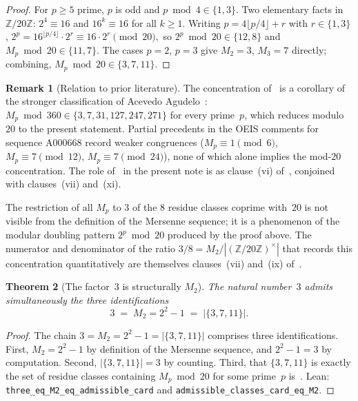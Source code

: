 \documentclass[11pt]{amsart}
\newtheorem{Theorem}{Theorem}[section]
\theoremstyle{definition}
\newtheorem{Remark}[Theorem]{Remark}
\newcommand{\Mp}{M_{p}}
\newcommand{\Ztwenty}{(\mathbb{Z}/20\mathbb{Z})^{\times}}
\newcommand{\lean}[1]{\texttt{#1}}
\begin{document}
\begin{proof}
For $p\geq 5$ prime, $p$ is odd and $p\bmod 4\in\{1,3\}$.  Two
elementary facts in $\mathbb{Z}/20\mathbb{Z}$: $2^{4}\equiv 16$ and
$16^{k}\equiv 16$ for all $k\geq 1$.  Writing $p=4\lfloor p/4\rfloor+r$
with $r\in\{1,3\}$,
$
  2^{p} = 16^{\lfloor p/4\rfloor}\cdot 2^{r} \equiv 16\cdot 2^{r}
  \pmod{20},
$
so $2^{p}\bmod 20\in\{12,8\}$ and $\Mp\bmod 20\in\{11,7\}$.  The cases
$p=2$, $p=3$ give $M_{2}=3$, $M_{3}=7$ directly; combining,
$\Mp\bmod 20\in\{3,7,11\}$.
\end{proof}

\begin{Remark}[Relation to prior
literature]\label{rem:acevedo}
The concentration of~ is a corollary of
the stronger classification of Acevedo
Agudelo~\cite{acevedo-2020}:
$\Mp\bmod 360\in\{3,7,31,127,247,271\}$ for every prime~$p$, which
reduces modulo~$20$ to the present statement. Partial precedents in
the OEIS comments for sequence A000668 record weaker congruences
($\Mp\equiv 1\pmod{6}$, $\Mp\equiv 7\pmod{12}$,
$\Mp\equiv 7\pmod{24}$), none of which alone implies the mod-$20$
concentration. The role of~ in the
present note is as clause~(vi)
of~, conjoined with clauses~(vii) and~(xi).
\end{Remark}

The restriction of all $\Mp$ to $3$ of the $8$ residue classes coprime
with~$20$ is not visible from the definition of the Mersenne sequence;
it is a phenomenon of the modular doubling pattern $2^{p}\bmod 20$
produced by the proof above.  The numerator and denominator of the
ratio $3/8=M_{2}/|\Ztwenty|$ that records this concentration
quantitatively are themselves clauses~(vii) and~(ix)
of~.

\begin{Theorem}[The factor~$3$ is structurally $M_{2}$]\label{thm:three-main}
The natural number~$3$ admits simultaneously the three identifications
\[
  3 \;=\; M_{2}=2^{2}-1 \;=\; \bigl|\{3,7,11\}\bigr|.
\]
\end{Theorem}

\begin{proof}
The chain $3 = M_{2} = 2^{2}-1 = |\{3,7,11\}|$ comprises three
identifications.  First, $M_{2}=2^{2}-1$ by definition of the Mersenne
sequence, and $2^{2}-1=3$ by computation.  Second,
$|\{3,7,11\}|=3$ by counting.  Third, that $\{3,7,11\}$ is exactly
the set of residue classes containing $\Mp\bmod 20$ for some
prime~$p$ is~.  Lean:
\lean{three\_eq\_M2\_eq\_admissible\_card} and
\lean{admissible\_classes\_card\_eq\_M2}.
\end{proof}
\end{document}
